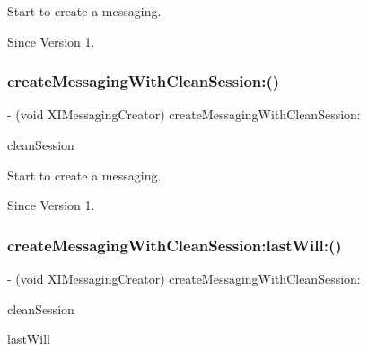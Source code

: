 Start to create a messaging. 

\begin{DoxySince}{Since}
Version 1. 
\end{DoxySince}
\hypertarget{protocol_x_i_messaging_creator_01-p_a0b22a598875adcfdbaf5b7a01788eb2c}{}\label{protocol_x_i_messaging_creator_01-p_a0b22a598875adcfdbaf5b7a01788eb2c} 
\subsubsection{\texorpdfstring{create\+Messaging\+With\+Clean\+Session\+:()}{createMessagingWithCleanSession:()}}
{\footnotesize\ttfamily -\/ (void X\+I\+Messaging\+Creator) create\+Messaging\+With\+Clean\+Session\+: \begin{DoxyParamCaption}\item[{(B\+O\+OL)}]{clean\+Session }\end{DoxyParamCaption}}



Start to create a messaging. 

\begin{DoxySince}{Since}
Version 1. 
\end{DoxySince}
\hypertarget{protocol_x_i_messaging_creator_01-p_ab776673e132b56a4cbe7a1ceb5c0888e}{}\label{protocol_x_i_messaging_creator_01-p_ab776673e132b56a4cbe7a1ceb5c0888e} 
\subsubsection{\texorpdfstring{create\+Messaging\+With\+Clean\+Session\+:last\+Will\+:()}{createMessagingWithCleanSession:lastWill:()}}
{\footnotesize\ttfamily -\/ (void X\+I\+Messaging\+Creator) \hyperlink{protocol_x_i_messaging_creator_01-p_a0b22a598875adcfdbaf5b7a01788eb2c}{create\+Messaging\+With\+Clean\+Session\+:} \begin{DoxyParamCaption}\item[{(B\+O\+OL)}]{clean\+Session }\item[{lastWill:(\hyperlink{class_x_i_last_will}{X\+I\+Last\+Will} $\ast$)}]{last\+Will }\end{DoxyParamCaption}}




